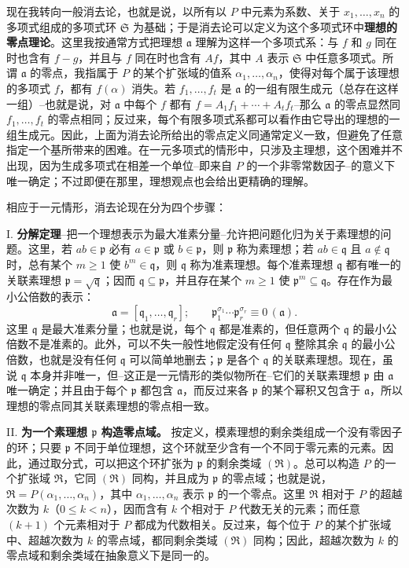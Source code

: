 \documentclass[11pt]{article}
\newcommand{\frakR}{\mathfrak R}
\newcommand{\frakS}{\mathfrak S}
\newcommand{\fraka}{\mathfrak a}
\newcommand{\frakp}{\mathfrak p}
\newcommand{\frakq}{\mathfrak q}
\newcommand{\srcemph}[1]{\textbf{#1}}
\begin{document}
现在我转向一般消去论，也就是说，以所有以 $P$ 中元素为系数、关于 $x_1,\ldots,x_n$ 的多项式组成的多项式环 $\frakS$ 为基础；于是消去论可以定义为这个多项式环中\srcemph{理想的零点理论}。这里我按通常方式把理想 $\fraka$ 理解为这样一个多项式系：与 $f$ 和 $g$ 同在时也含有 $f-g$，并且与 $f$ 同在时也含有 $Af$，其中 $A$ 表示 $\frakS$ 中任意多项式。所谓 $\fraka$ 的零点，我指属于 $P$ 的某个扩张域的值系 $\alpha_1,\ldots,\alpha_n$，使得对每个属于该理想的多项式 $f$，都有 $f(\alpha)$ 消失。若 $f_1,\ldots,f_t$ 是 $\fraka$ 的一组有限生成元（总存在这样一组）--也就是说，对 $\fraka$ 中每个 $f$ 都有 $f=A_1f_1+\cdots+A_tf_t$--那么 $\fraka$ 的零点显然同 $f_1,\ldots,f_t$ 的零点相同；反过来，每个有限多项式系都可以看作由它导出的理想的一组生成元。因此，上面为消去论所给出的零点定义同通常定义一致，但避免了任意指定一个基所带来的困难。在一元多项式的情形中，只涉及主理想，这个困难并不出现，因为生成多项式在相差一个单位--即来自 $P$ 的一个非零常数因子--的意义下唯一确定；不过即便在那里，理想观点也会给出更精确的理解。

相应于一元情形，消去论现在分为四个步骤：

\noindent I. \srcemph{分解定理}--把一个理想表示为最大准素分量--允许把问题化归为关于素理想的问题。这里，若 $ab\in\frakp$ 必有 $a\in\frakp$ 或 $b\in\frakp$，则 $\frakp$ 称为素理想；若 $ab\in\frakq$ 且 $a\notin\frakq$ 时，总有某个 $m\geq 1$ 使 $b^m\in\frakq$，则 $\frakq$ 称为准素理想。每个准素理想 $\frakq$ 都有唯一的关联素理想 $\frakp=\sqrt{\frakq}$；因而 $\frakq\subseteq\frakp$，并且存在某个 $m\geq 1$ 使 $\frakp^m\subseteq\frakq$。存在作为最小公倍数的表示：
\[
 \fraka=[\frakq_1,\ldots,\frakq_r];\qquad
 \frakp_1^{\sigma_1}\cdots \frakp_r^{\sigma_r}\equiv 0\,(\fraka).
\]
这里 $\frakq$ 是最大准素分量；也就是说，每个 $\frakq$ 都是准素的，但任意两个 $\frakq$ 的最小公倍数不是准素的。此外，可以不失一般性地假定没有任何 $\frakq$ 整除其余 $\frakq$ 的最小公倍数，也就是没有任何 $\frakq$ 可以简单地删去；$\frakp$ 是各个 $\frakq$ 的关联素理想。现在，虽说 $\frakq$ 本身并非唯一，但--这正是一元情形的类似物所在--它们的关联素理想 $\frakp$ 由 $\fraka$ 唯一确定；并且由于每个 $\frakp$ 都包含 $\fraka$，而反过来各 $\frakp$ 的某个幂积又包含于 $\fraka$，所以理想的零点同其关联素理想的零点相一致。

\noindent II. \srcemph{为一个素理想 $\frakp$ 构造零点域。} 按定义，模素理想的剩余类组成一个没有零因子的环；只要 $\frakp$ 不同于单位理想，这个环就至少含有一个不同于零元素的元素。因此，通过取分式，可以把这个环扩张为 $\frakp$ 的剩余类域 $(\frakR)$。总可以构造 $P$ 的一个扩张域 $\frakR$，它同 $(\frakR)$ 同构，并且成为 $\frakp$ 的零点域；也就是说，$\frakR=P(\alpha_1,\ldots,\alpha_n)$，其中 $\alpha_1,\ldots,\alpha_n$ 表示 $\frakp$ 的一个零点。这里 $\frakR$ 相对于 $P$ 的超越次数为 $k$（$0\leq k<n$），因而含有 $k$ 个相对于 $P$ 代数无关的元素；而任意 $(k+1)$ 个元素相对于 $P$ 都成为代数相关。反过来，每个位于 $P$ 的某个扩张域中、超越次数为 $k$ 的零点域，都同剩余类域 $(\frakR)$ 同构；因此，超越次数为 $k$ 的零点域和剩余类域在抽象意义下是同一的。
\end{document}
